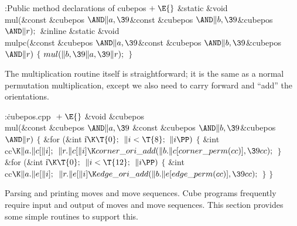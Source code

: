 \Y\B\4:Public method declarations of cubepos\X${}\mathrel+\E{}$\6
\&{static} \&{void} \\{mul}(\&{const} \&{cubepos} ${}{\AND}\|a,\39{}$\&{const} %
\&{cubepos} ${}{\AND}\|b,\39{}$\&{cubepos} ${}{\AND}\|r);{}$\7
\&{inline} \&{static} \&{void} \\{mulpc}(\&{const} \&{cubepos} ${}{\AND}\|a,%
\39{}$\&{const} \&{cubepos} ${}{\AND}\|b,\39{}$\&{cubepos} ${}{\AND}\|r){}$\1\1%
\2\2\6
${}\{{}$\1\6
${}\\{mul}(\|b,\39\|a,\39\|r);{}$\6
\4${}\}{}$\2\par
\fi

The multiplication routine itself is straightforward; it is
the same as a normal permutation multiplication, except we also
need to carry forward and ``add'' the orientations.

\Y\B\4:\.{cubepos.cpp }\X${}\mathrel+\E{}$\6
\&{void} \&{cubepos}\DC\\{mul}(\&{const} \&{cubepos} ${}{\AND}\|a,\39{}$%
\&{const} \&{cubepos} ${}{\AND}\|b,\39{}$\&{cubepos} ${}{\AND}\|r){}$\1\1\2\2\6
${}\{{}$\1\6
\&{for} (\&{int} \|i${}\K\T{0};{}$ ${}\|i<\T{8};{}$ ${}\|i\PP){}$\5
${}\{{}$\1\6
\&{int} \\{cc}${}\K\|a.\|c[\|i];{}$\7
${}\|r.\|c[\|i]\K\\{corner\_ori\_add}(\|b.\|c[\\{corner\_perm}(\\{cc})],\39%
\\{cc});{}$\6
\4${}\}{}$\2\6
\&{for} (\&{int} \|i${}\K\T{0};{}$ ${}\|i<\T{12};{}$ ${}\|i\PP){}$\5
${}\{{}$\1\6
\&{int} \\{cc}${}\K\|a.\|e[\|i];{}$\7
${}\|r.\|e[\|i]\K\\{edge\_ori\_add}(\|b.\|e[\\{edge\_perm}(\\{cc})],\39%
\\{cc});{}$\6
\4${}\}{}$\2\6
\4${}\}{}$\2\par
\fi

Parsing and printing moves and move sequences.
Cube programs frequently require input and output of moves and move
sequences.  This section provides some simple routines to support
this.

